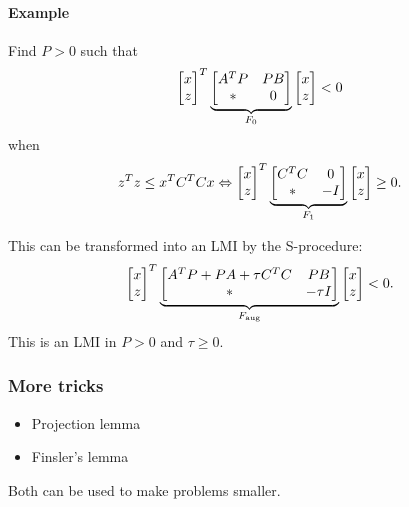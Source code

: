 \paragraph{Example} Find $P>0$ such that
%
\begin{equation}
  \begin{bmatrix} x \\ z \end{bmatrix}^{T}
  \underbrace{\begin{bmatrix} A^{T} P & PB \\ * & 0 \end{bmatrix}}_{F_0}
  \begin{bmatrix} x \\ z \end{bmatrix}
  < 0
\end{equation}
%
when
%
\begin{equation}
  z^{T} z \leq x^{T} C^{T} C x
  \Leftrightarrow
  \begin{bmatrix} x \\ z \end{bmatrix}^{T}
  \underbrace{\begin{bmatrix} C^{T} C & 0 \\ * & -I \end{bmatrix}}_{F_1}
  \begin{bmatrix} x \\ z \end{bmatrix}
  \geq 0.
\end{equation}

This can be transformed into an LMI by the S-procedure:
%
\begin{equation}
  \begin{bmatrix} x \\ z \end{bmatrix}^{T}
  \underbrace
    {
      \begin{bmatrix}
        A^{T} P + PA + \tau C^{T} C & PB \\
        * & -\tau I
      \end{bmatrix}
    }_{F_\mathrm{aug}}
  \begin{bmatrix} x \\ z \end{bmatrix}
  < 0.
\end{equation}
This is an LMI in $P>0$ and $\tau \geq 0$.

\subsubsection{More tricks}
\begin{itemize}
  \item Projection lemma
  \item Finsler's lemma
\end{itemize}
Both can be used to make problems smaller.
